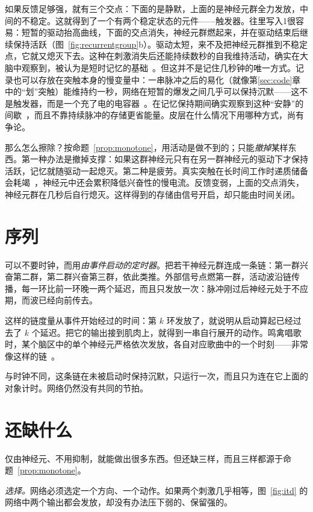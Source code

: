 如果反馈足够强，就有三个交点：下面的是静默，上面的是神经元群全力发放，中间的不稳定。这就得到了一个有两个稳定状态的元件——触发器。往里写入1很容易：短暂的驱动抬高曲线，下面的交点消失，神经元群燃起来，并在驱动结束后继续保持活跃（图~\ref{fig:recurrentgroup}b）。驱动太短，来不及把神经元群推到不稳定点，它就又熄灭下去。这种在刺激消失后还能持续数秒的自我维持活动，确实在大脑中观察到，被认为是短时记忆的基础~\cite{Wang2001}。但这并不是记住几秒钟的唯一方式。记录也可以存放在突触本身的慢变量中：一串脉冲之后的易化（就像第\ref{sec:code}章中的“划”突触）能维持约一秒，网络在短暂的爆发之间几乎可以保持沉默——这不是触发器，而是一个充了电的电容器~\cite{Mongillo2008}。在记忆保持期间确实观察到这种“安静”的间歇~\cite{Stokes2015}，而且不靠持续脉冲的存储更省能量。皮层在什么情况下用哪种方式，尚有争论。

那么怎么擦除？按命题~\ref{prop:monotone}，用活动是做不到的；只能\emph{撤掉}某样东西。第一种办法是撤掉支撑：如果这群神经元只有在另一群神经元的驱动下才保持活跃，记忆就随驱动一起熄灭。第二种是疲劳。真实突触在长时间工作时递质储备会耗竭~\cite{Tsodyks1997}，神经元中还会累积降低兴奋性的慢电流。反馈变弱，上面的交点消失，神经元群在几秒后自行熄灭。这样得到的存储由信号开启，却只能由时间关闭。

\section{序列}

可以不要时钟，而用\emph{由事件启动的定时器}。把若干神经元群连成一条链：第一群兴奋第二群，第二群兴奋第三群，依此类推。外部信号点燃第一群，活动波沿链传播，每一环比前一环晚一两个延迟，而且只发放一次：脉冲刚过后神经元处于不应期，而波已经向前传去。

这样的链度量从事件开始经过的时间：第 $k$ 环发放了，就说明从启动算起已经过去了 $k$ 个延迟。把它的输出接到肌肉上，就得到一串自行展开的动作。鸣禽唱歌时，某个脑区中的单个神经元严格依次发放，各自对应歌曲中的一个时刻——非常像这样的链~\cite{Hahnloser2002}。

与时钟不同，这条链在未被启动时保持沉默，只运行一次，而且只为连在它上面的对象计时。网络仍然没有共同的节拍。

\section{还缺什么}

仅由神经元、不用抑制，就能做出很多东西。但还缺三样，而且三样都源于命题~\ref{prop:monotone}。

\emph{选择。}网络必须选定一个方向、一个动作。如果两个刺激几乎相等，图~\ref{fig:itd} 的网络中两个输出都会发放，却没有办法压下弱的、保留强的。

